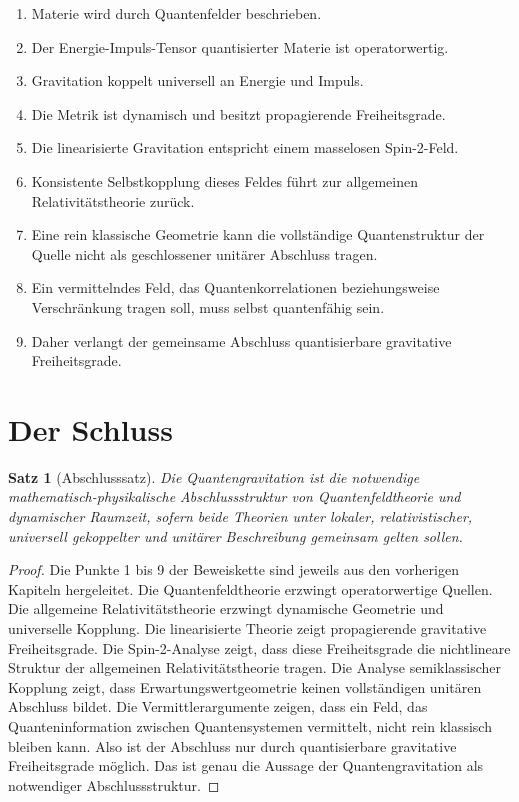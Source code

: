 \documentclass[11pt,a4paper]{book}
\newtheorem{satz}{Satz}[chapter]
\theoremstyle{remark}
\begin{document}
\begin{enumerate}
\item Materie wird durch Quantenfelder beschrieben.
\item Der Energie-Impuls-Tensor quantisierter Materie ist operatorwertig.
\item Gravitation koppelt universell an Energie und Impuls.
\item Die Metrik ist dynamisch und besitzt propagierende Freiheitsgrade.
\item Die linearisierte Gravitation entspricht einem masselosen Spin-2-Feld.
\item Konsistente Selbstkopplung dieses Feldes führt zur allgemeinen Relativitätstheorie zurück.
\item Eine rein klassische Geometrie kann die vollständige Quantenstruktur der Quelle nicht als geschlossener unitärer Abschluss tragen.
\item Ein vermittelndes Feld, das Quantenkorrelationen beziehungsweise Verschränkung tragen soll, muss selbst quantenfähig sein.
\item Daher verlangt der gemeinsame Abschluss quantisierbare gravitative Freiheitsgrade.
\end{enumerate}

\section{Der Schluss}
\begin{satz}[Abschlusssatz]
Die Quantengravitation ist die notwendige mathematisch-physikalische Abschlussstruktur von Quantenfeldtheorie und dynamischer Raumzeit, sofern beide Theorien unter lokaler, relativistischer, universell gekoppelter und unitärer Beschreibung gemeinsam gelten sollen.
\end{satz}

\begin{proof}
Die Punkte 1 bis 9 der Beweiskette sind jeweils aus den vorherigen Kapiteln hergeleitet. Die Quantenfeldtheorie erzwingt operatorwertige Quellen. Die allgemeine Relativitätstheorie erzwingt dynamische Geometrie und universelle Kopplung. Die linearisierte Theorie zeigt propagierende gravitative Freiheitsgrade. Die Spin-2-Analyse zeigt, dass diese Freiheitsgrade die nichtlineare Struktur der allgemeinen Relativitätstheorie tragen. Die Analyse semiklassischer Kopplung zeigt, dass Erwartungswertgeometrie keinen vollständigen unitären Abschluss bildet. Die Vermittlerargumente zeigen, dass ein Feld, das Quanteninformation zwischen Quantensystemen vermittelt, nicht rein klassisch bleiben kann. Also ist der Abschluss nur durch quantisierbare gravitative Freiheitsgrade möglich. Das ist genau die Aussage der Quantengravitation als notwendiger Abschlussstruktur.
\end{proof}
\end{document}
